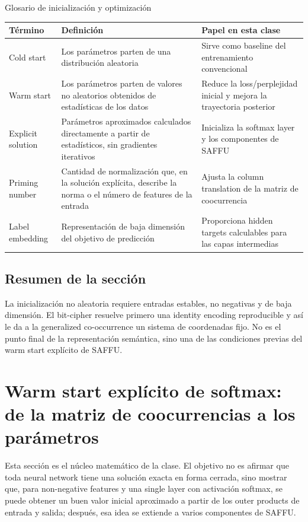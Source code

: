 \documentclass[a4paper]{article}
\begin{document}
\begin{knowledgebox}{Glosario de inicialización y optimización}
\begin{tabularx}{\textwidth}{L{0.18\textwidth} L{0.27\textwidth} X}
\toprule
Término & Definición & Papel en esta clase \\
\midrule
Cold start & Los parámetros parten de una distribución aleatoria & Sirve como baseline del entrenamiento convencional \\
Warm start & Los parámetros parten de valores no aleatorios obtenidos de estadísticas de los datos & Reduce la loss/perplejidad inicial y mejora la trayectoria posterior \\
Explicit solution & Parámetros aproximados calculados directamente a partir de estadísticos, sin gradientes iterativos & Inicializa la softmax layer y los componentes de SAFFU \\
Priming number & Cantidad de normalización que, en la solución explícita, describe la norma o el número de features de la entrada & Ajusta la column translation de la matriz de coocurrencia \\
Label embedding & Representación de baja dimensión del objetivo de predicción & Proporciona hidden targets calculables para las capas intermedias \\
\bottomrule
\end{tabularx}
\end{knowledgebox}

\subsection{Resumen de la sección}

La inicialización no aleatoria requiere entradas estables, no negativas y de baja dimensión. El bit-cipher resuelve primero una identity encoding reproducible y así le da a la generalized co-occurrence un sistema de coordenadas fijo. No es el punto final de la representación semántica, sino una de las condiciones previas del warm start explícito de SAFFU.
\section{Warm start explícito de softmax: de la matriz de coocurrencias a los parámetros}

Esta sección es el núcleo matemático de la clase. El objetivo no es afirmar que toda neural network tiene una solución exacta en forma cerrada, sino mostrar que, para non-negative features y una single layer con activación softmax, se puede obtener un buen valor inicial aproximado a partir de los outer products de entrada y salida; después, esa idea se extiende a varios componentes de SAFFU.
\end{document}
